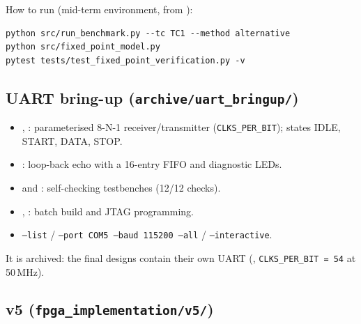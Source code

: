 \documentclass[11pt]{article}
\begin{document}
How to run (mid-term environment, from ):
\begin{lstlisting}
python src/run_benchmark.py --tc TC1 --method alternative
python src/fixed_point_model.py
pytest tests/test_fixed_point_verification.py -v
\end{lstlisting}

\subsection{UART bring-up (\texttt{archive/uart\_bringup/})}

\begin{itemize}
  \item {}, : parameterised 8-N-1 receiver/transmitter (\texttt{CLKS\_PER\_BIT}); states IDLE, START, DATA, STOP.
  \item {}: loop-back echo with a 16-entry FIFO and diagnostic LEDs.
  \item {} and : self-checking testbenches (12/12 checks).
  \item {}, : batch build and JTAG programming.
  \item {} \texttt{--list} / \texttt{--port COM5 --baud 115200 --all} / \texttt{--interactive}.
\end{itemize}
It is archived: the final designs contain their own UART (, \texttt{CLKS\_PER\_BIT = 54} at 50\,MHz).

\subsection{v5 (\texttt{fpga\_implementation/v5/})}
\end{document}
